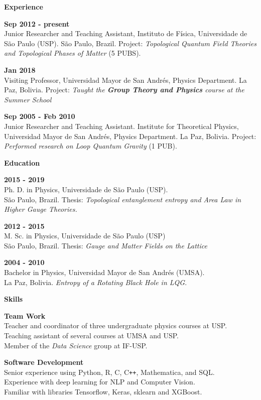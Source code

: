 \documentclass[a4paper,12pt,final]{memoir}
\newcommand{\Sep}{\vspace{1.5em}}
\newcommand{\SmallSep}{\vspace{0.5em}}
\newcommand{\CVSection}[1]
	{\Large\textbf{#1}\par
	\SmallSep\normalsize\normalfont}
\newcommand{\CVItem}[1]
	{\textbf{\color{RoyalBlue} #1}}
\begin{document}
\CVSection{Experience}
\CVItem{Sep 2012 - present}\\
Junior Researcher and Teaching Assistant,  Instituto de F\'{i}sica, Universidade de S\~{a}o Paulo 
(USP). S\~{a}o Paulo, Brazil. Project: \emph{Topological Quantum Field Theories and Topological Phases of Matter} (5 PUBS).
\SmallSep


\CVItem{Jan 2018}\\
Visiting Professor, Universidad Mayor de San Andr\'{e}s, Physics Department. La Paz, Bolivia. Project: \emph{Taught the \textbf{Group Theory and Physics} course at the Summer School}
\SmallSep

\CVItem{Sep 2005 - Feb 2010}\\
Junior Researcher and Teaching Assistant. Institute for Theoretical Physics,
Universidad Mayor de San Andr\'{e}s, Physics Department. La Paz, Bolivia. Project: \emph{Performed research on Loop Quantum Gravity} (1 PUB).

\Sep

\CVSection{Education}
\CVItem{2015 - 2019}\\
Ph. D. in Physics, Universidade de S\~{a}o Paulo (USP).\\ 
S\~{a}o Paulo, Brazil. Thesis:  \emph{Topological entanglement entropy and Area Law in Higher Gauge Theories.} 
\SmallSep

\CVItem{2012 - 2015}\\
M. Sc. in Physics, Universidade de S\~{a}o Paulo (USP)\\
S\~{a}o Paulo, Brazil. Thesis: \emph{Gauge and Matter Fields on the Lattice}
\SmallSep

\CVItem{2004 - 2010}\\
Bachelor in Physics, Universidad Mayor de San Andr\'{e}s (UMSA).\\
La Paz, Bolivia. \emph{Entropy of a Rotating Black Hole in LQG}.

\Sep

\CVSection{Skills}


\CVItem{Team Work}\\
Teacher and coordinator of three undergraduate physics courses at USP.\\
Teaching assistant of several courses at UMSA and USP.\\
Member of the \emph{Data Science} group at IF-USP.

\CVItem{Software Development}\\
Senior experience using Python, R, C, C\texttt{++}, Mathematica, and SQL.\\
Experience with deep learning for NLP and Computer Vision.\\
Familiar with libraries Tensorflow, Keras, sklearn and XGBoost.





\end{document}
